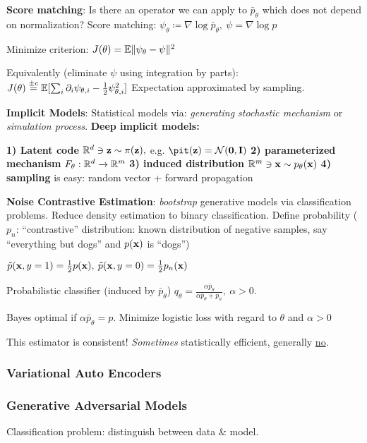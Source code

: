 \textbf{Score matching}: Is there an operator we can apply to $\bar{p}_\theta$ which does not depend on normalization? Score matching:
\tab $\psi_\theta\coloneqq\nabla\log \bar{p}_\theta,\> \psi=\nabla \log p$

Minimize criterion: $J(\theta)=\mathbb E \lVert \psi_\theta - \psi \rVert^2$

Equivalently (eliminate $\psi$ using integration by parts):\\
\tab$J(\theta) \overset{\pm c}{=} \mathbb E \lbrack \sum_i \partial_i \psi_{\theta,i}-\frac{1}{2}\psi^2_{\theta,i}\rbrack$
Expectation approximated by sampling.

\textbf{Implicit Models}: Statistical models via: \emph{generating stochastic mechanism} or \emph{simulation process}. \textbf{Deep implicit models:}

\textbf{1) Latent code} $\mathbb R^d\ni\mathbf z\sim\pi(\mathbf z),$ e.g. $\pit(\vz)=\cN(\mathbf{0},\vI)$
\textbf{2) parameterized mechanism} $F_\theta: \mathbb R^d\xrightarrow{}\mathbb R^m$
\textbf{3) induced distribution} $\mathbb R^m \ni \mathbf x\sim p_\theta(\mathbf x)$
\textbf{4) sampling} is easy: random vector + forward propagation

\textbf{Noise Contrastive Estimation}: \emph{bootstrap} generative models via classification problems. Reduce density estimation to binary classification. Define probability ($p_n$: ``contrastive'' distribution: known distribution of negative samples, say ``everything but dogs'' and $p(\mathbf x)$ is ``dogs'')

\tab $\Tilde{p} (\mathbf x,y=1)=\frac{1}{2}p(\mathbf x),\> \Tilde{p}(\mathbf x,y=0)=\frac{1}{2}p_n(\mathbf x)$

Probabilistic classifier (induced by $\bar{p}_\theta$)
\tab $q_\theta = \frac{\alpha \bar{p}_\theta}{\alpha \bar{p}_\theta + p_n},\> \alpha>0$.

Bayes optimal if $\alpha\bar{p}_\theta=p$. Minimize logistic loss with regard to $\theta$ and $\alpha>0$

This estimator is consistent! \emph{Sometimes} statistically efficient, generally \underline{no}.

\subsubsection{Variational Auto Encoders}
\subsubsection{Generative Adversarial Models}
\label{ssub:gams}

Classification problem: distinguish between data \& model.

